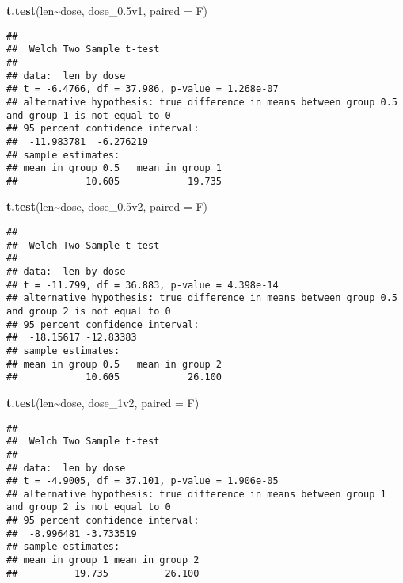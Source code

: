 \documentclass[
]{article}
\newenvironment{Shaded}{\begin{snugshade}}{\end{snugshade}}
\newcommand{\AttributeTok}[1]{\textcolor[rgb]{0.13,0.29,0.53}{#1}}
\newcommand{\FloatTok}[1]{\textcolor[rgb]{0.00,0.00,0.81}{#1}}
\newcommand{\FunctionTok}[1]{\textcolor[rgb]{0.13,0.29,0.53}{\textbf{#1}}}
\newcommand{\NormalTok}[1]{#1}
\newcommand{\SpecialCharTok}[1]{\textcolor[rgb]{0.81,0.36,0.00}{\textbf{#1}}}
\begin{document}
\begin{Shaded}
\begin{Highlighting}[]
\FunctionTok{t.test}\NormalTok{(len}\SpecialCharTok{\textasciitilde{}}\NormalTok{dose, dose\_0}\FloatTok{.5}\NormalTok{v1, }\AttributeTok{paired =}\NormalTok{ F)}
\end{Highlighting}
\end{Shaded}

\begin{verbatim}
## 
##  Welch Two Sample t-test
## 
## data:  len by dose
## t = -6.4766, df = 37.986, p-value = 1.268e-07
## alternative hypothesis: true difference in means between group 0.5 and group 1 is not equal to 0
## 95 percent confidence interval:
##  -11.983781  -6.276219
## sample estimates:
## mean in group 0.5   mean in group 1 
##            10.605            19.735
\end{verbatim}

\begin{Shaded}
\begin{Highlighting}[]
\FunctionTok{t.test}\NormalTok{(len}\SpecialCharTok{\textasciitilde{}}\NormalTok{dose, dose\_0}\FloatTok{.5}\NormalTok{v2, }\AttributeTok{paired =}\NormalTok{ F)}
\end{Highlighting}
\end{Shaded}

\begin{verbatim}
## 
##  Welch Two Sample t-test
## 
## data:  len by dose
## t = -11.799, df = 36.883, p-value = 4.398e-14
## alternative hypothesis: true difference in means between group 0.5 and group 2 is not equal to 0
## 95 percent confidence interval:
##  -18.15617 -12.83383
## sample estimates:
## mean in group 0.5   mean in group 2 
##            10.605            26.100
\end{verbatim}

\begin{Shaded}
\begin{Highlighting}[]
\FunctionTok{t.test}\NormalTok{(len}\SpecialCharTok{\textasciitilde{}}\NormalTok{dose, dose\_1v2, }\AttributeTok{paired =}\NormalTok{ F)}
\end{Highlighting}
\end{Shaded}

\begin{verbatim}
## 
##  Welch Two Sample t-test
## 
## data:  len by dose
## t = -4.9005, df = 37.101, p-value = 1.906e-05
## alternative hypothesis: true difference in means between group 1 and group 2 is not equal to 0
## 95 percent confidence interval:
##  -8.996481 -3.733519
## sample estimates:
## mean in group 1 mean in group 2 
##          19.735          26.100
\end{verbatim}
\end{document}
